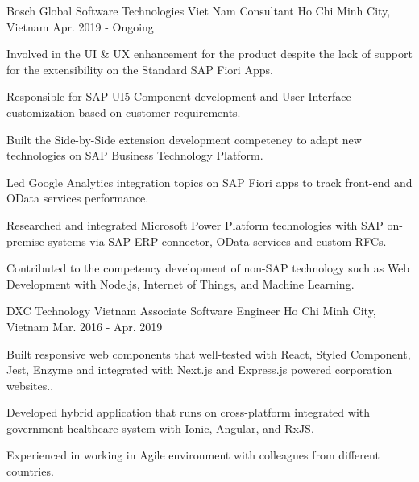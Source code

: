 


\begin{cventries}


\cventry
{Bosch Global Software Technologies Viet Nam}
{Consultant}
{Ho Chi Minh City, Vietnam}
{Apr. 2019 - Ongoing}
{
\begin{cvitems}
\item {Involved in the UI \& UX enhancement for the product despite the lack of support for the extensibility on the Standard SAP Fiori Apps.}
\item {Responsible for SAP UI5 Component development and User Interface customization based on customer requirements.}
\item {Built the Side-by-Side extension development competency to adapt new technologies on SAP Business Technology Platform.}
\item {Led Google Analytics integration topics on SAP Fiori apps to track front-end and OData services performance.}
\item {Researched and integrated Microsoft Power Platform technologies with SAP on-premise systems via SAP ERP connector, OData services and custom RFCs.}
\item {Contributed to the competency development of non-SAP technology such as Web Development with Node.js, Internet of Things, and Machine Learning.}
\end{cvitems}
}


\cventry
{DXC Technology Vietnam}
{Associate Software Engineer}
{Ho Chi Minh City, Vietnam}
{Mar. 2016 - Apr. 2019}
{
\begin{cvitems}
\item {Built responsive web components that well-tested with React, Styled Component, Jest, Enzyme and integrated with Next.js and Express.js powered corporation websites..}
\item {Developed hybrid application that runs on cross-platform integrated with government healthcare system with Ionic, Angular, and RxJS.}
\item {Experienced in working in Agile environment with colleagues from different countries.}
\end{cvitems}
}


\end{cventries}
